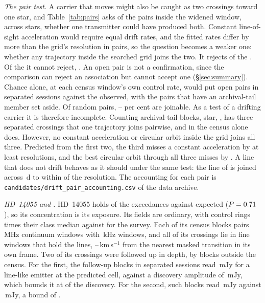 \emph{The pair test.} A carrier that moves might also be caught as two
crossings toward one star, and Table~\ref{tab:pairs} asks of the \TjNPair{}
pairs inside the widened window, across \TjNStarPair{} stars, whether one
transmitter could have produced both. Constant line-of-sight acceleration
would require equal drift rates, and the fitted rates differ by more than the
grid's resolution in \TjUneqDriftOf{} pairs, so the question
becomes a weaker one: whether any trajectory inside the searched grid joins
the two. It rejects \TjNExcl{} of the \TjNPair. Of the \TjNOpen{} it
cannot reject, \TjOpenEdgeClause. An open pair is not a confirmation, since the
comparison can reject an association but cannot accept one
(\S\ref{sec:summary}). Chance alone, at each census window's own control
rate, would put \OpExpSepRange{} open pairs in separated sessions against the
\OpObsSep{} observed, with the pairs that have an archival-tail member set
aside. Of random pairs, \OpJoinPctLo--\OpJoinPctHi{} per cent are
joinable. As a test of a drifting carrier it is therefore incomplete.
Counting archival-tail blocks, \OpNTriAllWord{} star, \OpTriStars, has three
separated crossings that one trajectory joins pairwise, and in the census
alone \OpNTriCenWord{} does. However, no constant acceleration or circular
orbit inside the grid joins all three. Predicted from the first two, the
third misses a constant acceleration by at least
\TrAMissMin{} resolutions, and the best circular orbit through all three
misses by \TrJointMissMin. A line that does not drift behaves as it should
under the same test: the \TjCtlLine{} line of \TjCtlStar{} is joined across
\TjCtlDtD\,d to within \TjCtlNSig{} of the resolution. The accounting for
each pair is
\texttt{candidates/\allowbreak drift\_pair\_accounting.csv} of the data
archive.

\label{sec:twostars}%
\emph{HD~14055 and \BkAlmaName.} HD~14055 holds \TwNExcHD{} of the
exceedances against \TwExpCtrlHD{} expected ($P=0.71$), so its
concentration is its exposure. Its fields are ordinary, with control rings
\TwRingQHD{} times their class median against \TwRingQSurv{} for the survey.
Each of its \LrHdNBlk{} census blocks pairs \LrHdNCoarse{}
\LrHdCoarseChanMHz\,MHz continuum windows with \LrHdNFine{}
\LrHdFineChanKHz\,kHz windows, and all \LrHdNCross{} of its crossings lie in
fine windows that hold the \LrHdFineLines{} lines, \TwHDMaskLo--\TwHDMaskHi\,km\,s$^{-1}$ from the nearest masked
transition in its own frame. Two of its crossings were followed up in depth, by blocks outside the
census. For the first, the \TwHDNDeepSepFirst{} follow-up blocks in separated
sessions read \TwHDRepFirst\,mJy for a line-like emitter at the predicted
cell, against a discovery amplitude of \TwHDDiscFirst\,mJy, which bounds it
at \TwHDFracFirst{} of the discovery. For the second, \TwHDNDeepSepSecond{}
such blocks read \TwHDRepSecond\,mJy against \TwHDDiscSecond\,mJy, a bound
of \TwHDFracSecond.

